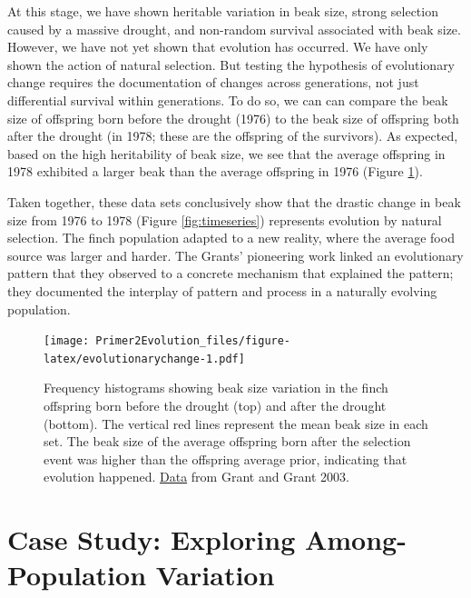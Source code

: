 \documentclass[
]{book}
\begin{document}
At this stage, we have shown heritable variation in beak size, strong selection caused by a massive drought, and non-random survival associated with beak size. However, we have not yet shown that evolution has occurred. We have only shown the action of natural selection. But testing the hypothesis of evolutionary change requires the documentation of changes across generations, not just differential survival within generations. To do so, we can can compare the beak size of offspring born before the drought (1976) to the beak size of offspring both after the drought (in 1978; these are the offspring of the survivors). As expected, based on the high heritability of beak size, we see that the average offspring in 1978 exhibited a larger beak than the average offspring in 1976 (Figure \ref{fig:evolutionarychange}).

Taken together, these data sets conclusively show that the drastic change in beak size from 1976 to 1978 (Figure \ref{fig:timeseries}) represents evolution by natural selection. The finch population adapted to a new reality, where the average food source was larger and harder. The Grants' pioneering work linked an evolutionary pattern that they observed to a concrete mechanism that explained the pattern; they documented the interplay of pattern and process in a naturally evolving population.

\begin{figure}
\centering
\texttt{[image: Primer2Evolution\_files/figure-latex/evolutionarychange-1.pdf]}
\caption{\label{fig:evolutionarychange}Frequency histograms showing beak size variation in the finch offspring born before the drought (top) and after the drought (bottom). The vertical red lines represent the mean beak size in each set. The beak size of the average offspring born after the selection event was higher than the offspring average prior, indicating that evolution happened. \href{data/3_offspring_beaks.csv}{Data} from Grant and Grant 2003.}
\end{figure}

\hypertarget{case-study-exploring-among-population-variation}{%
\section{Case Study: Exploring Among-Population Variation}\label{case-study-exploring-among-population-variation}}
\end{document}
